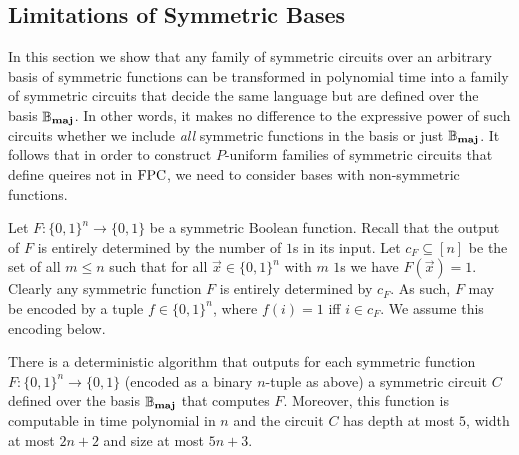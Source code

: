 \documentclass[../paper.tex]{subfiles}
\begin{document}
\subsection{Limitations of Symmetric Bases}
In this section we show that any family of symmetric circuits over an arbitrary
basis of symmetric functions can be transformed in polynomial time into a family
of symmetric circuits that decide the same language but are defined over the
basis $\mathbb{B}_{\text{\textbf{maj}}}$. In other words, it makes no difference to the
expressive power of such circuits whether we include \emph{all} symmetric
functions in the basis or just $\mathbb{B}_{\text{\textbf{maj}}}$. It follows that in order to
construct $P$-uniform families of symmetric circuits that define queires not in
$\text{\upshape FPC}$, we need to consider bases with non-symmetric functions.


Let $F : \{0,1\}^n\rightarrow \{0,1\}$ be a symmetric Boolean function. Recall
that the output of $F$ is entirely determined by the number of $1$s in its
input. Let $c_{F} \subseteq [n]$ be the set of all $m \leq n$ such that for all
$\vec{x} \in \{ 0,1 \}^n$ with $m$ $1$s we have $F (\vec{x}) = 1$. Clearly any
symmetric function $F$ is entirely determined by $c_{F}$. As such, $F$ may be
encoded by a tuple $f \in \{0,1\}^{n}$, where $f (i) = 1 $ iff $i \in c_{F}$. We
assume this encoding below.
 
\begin{prop}
  \label{prop:fuctions-maj}
  There is a deterministic algorithm that outputs for each symmetric function
  $F: \{0,1\}^n \rightarrow \{0,1\}$ (encoded as a binary $n$-tuple as above) a
  symmetric circuit $C$ defined over the basis $\mathbb{B}_{\text{\textbf{maj}}}$ that computes
  $F$. Moreover, this function is computable in time polynomial in $n$ and the
  circuit $C$ has depth at most $5$, width at most $2n+2$ and size at most $5n +
  3$.
\end{prop}
\end{document}
